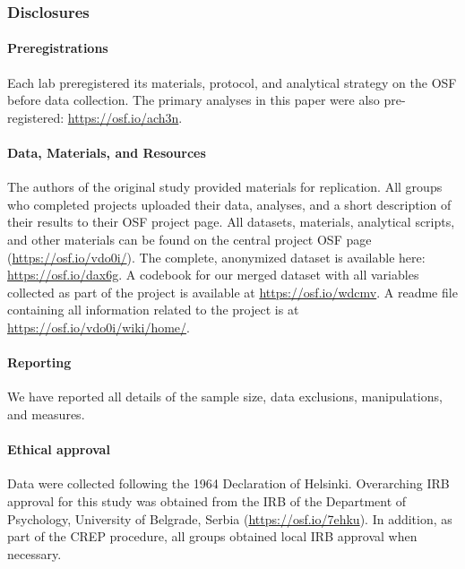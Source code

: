 \documentclass[
]{article}
\begin{document}
\subsubsection{Disclosures}\label{disclosures}

\paragraph{Preregistrations}\label{preregistrations}

Each lab preregistered its materials, protocol, and analytical strategy
on the OSF before data collection. The primary analyses in this paper
were also pre-registered: \url{https://osf.io/ach3n}.

\paragraph{Data, Materials, and
Resources}\label{data-materials-and-resources}

The authors of the original study provided materials for replication.
All groups who completed projects uploaded their data, analyses, and a
short description of their results to their OSF project page. All
datasets, materials, analytical scripts, and other materials can be
found on the central project OSF page (\url{https://osf.io/vdo0i/}). The
complete, anonymized dataset is available here:
\url{https://osf.io/dax6g}. A codebook for our merged dataset with all
variables collected as part of the project is available at
\url{https://osf.io/wdcmv}. A readme file containing all information
related to the project is at \url{https://osf.io/vdo0i/wiki/home/}.

\paragraph{Reporting}\label{reporting}

We have reported all details of the sample size, data exclusions,
manipulations, and measures.

\paragraph{Ethical approval}\label{ethical-approval}

Data were collected following the 1964 Declaration of Helsinki.
Overarching IRB approval for this study was obtained from the IRB of the
Department of Psychology, University of Belgrade, Serbia
(\url{https://osf.io/7ehku}). In addition, as part of the CREP
procedure, all groups obtained local IRB approval when necessary.
\end{document}
